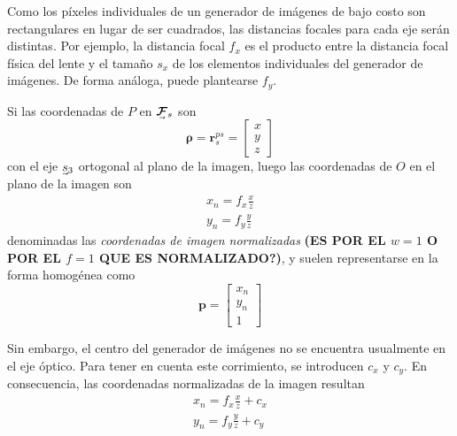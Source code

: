 Como los píxeles individuales de un generador de imágenes de bajo costo son rectangulares en lugar de ser cuadrados, las distancias focales para cada eje serán distintas. Por ejemplo, la distancia focal $f_x$ es el producto entre la distancia focal física del lente y el tamaño $s_x$ de los elementos individuales del generador de imágenes. De forma análoga, puede plantearse $f_y$.

Si las coordenadas de $P$ en $\undervec{\bm{\mathcal{F}}}_s$ son
\begin{equation}
    \bm{\rho} = \bm{r}_s^{ps} = 
    \begin{bmatrix}
        x \\
        y \\
        z
    \end{bmatrix}
\end{equation}
con el eje $\undervec{s}_3$ ortogonal al plano de la imagen, luego las coordenadas de $O$ en el plano de la imagen son
\begin{align}
    x_n = f_x \frac{x}{z} \\
    y_n = f_y \frac{y}{z}
\end{align}
denominadas las \textit{coordenadas de imagen normalizadas} \textbf{(ES POR EL $w=1$ O POR EL $f=1$ QUE ES NORMALIZADO?)}, y suelen representarse en la forma homogénea como
\begin{equation}
    \bm{p} =
    \begin{bmatrix}
        x_n \\
        y_n \\
        1
        \label{eq:homogeneousnormalizedimagecoordinates}
    \end{bmatrix}
\end{equation}

Sin embargo, el centro del generador de imágenes no se encuentra usualmente en el eje óptico. Para tener en cuenta este corrimiento, se introducen $c_x$ y $c_y$. En consecuencia, las coordenadas normalizadas de la imagen resultan
\begin{align}
    x_n = f_x \frac{x}{z} + c_x
    \label{eq:x_n}
    \\
    y_n = f_y \frac{y}{z} + c_y
    \label{eq:y_n}
\end{align}

